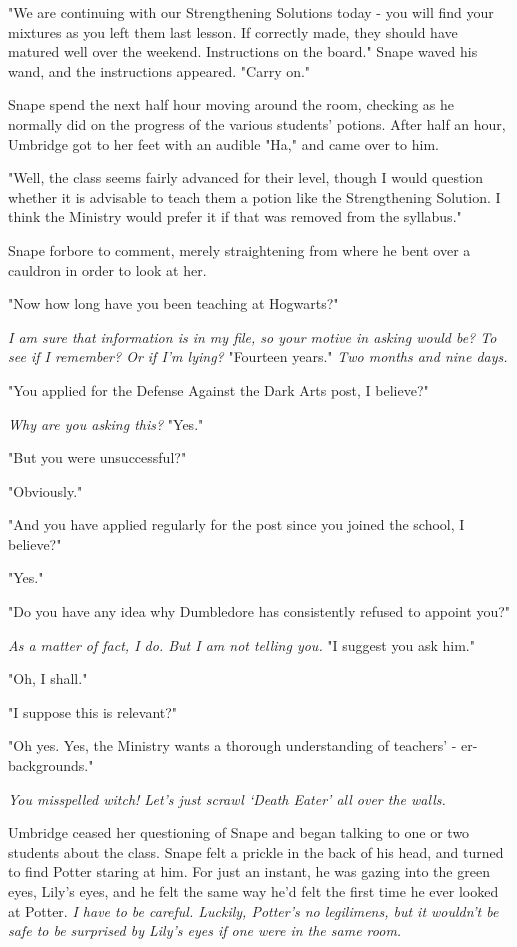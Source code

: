 "We are continuing with our Strengthening Solutions today - you will find your mixtures as you left them last lesson. If correctly made, they should have matured well over the weekend. Instructions on the board." Snape waved his wand, and the instructions appeared. "Carry on."

Snape spend the next half hour moving around the room, checking as he normally did on the progress of the various students' potions. After half an hour, Umbridge got to her feet with an audible "Ha," and came over to him.

"Well, the class seems fairly advanced for their level, though I would question whether it is advisable to teach them a potion like the Strengthening Solution. I think the Ministry would prefer it if that was removed from the syllabus."

Snape forbore to comment, merely straightening from where he bent over a cauldron in order to look at her.

"Now{\el} how long have you been teaching at Hogwarts?"

\emph{I am sure that information is in my file, so your motive in asking would be{\el}? To see if I remember? Or if I'm lying?} "Fourteen years." \emph{Two months and nine days.}

"You applied for the Defense Against the Dark Arts post, I believe?"

\emph{Why are you asking this?} "Yes."

"But you were unsuccessful?"

"Obviously."

"And you have applied regularly for the post since you joined the school, I believe?"

"Yes."

"Do you have any idea why Dumbledore has consistently refused to appoint you?"

\emph{As a matter of fact, I do. But I am not telling you.} "I suggest you ask him."

"Oh, I shall."

"I suppose this is relevant?"

"Oh yes. Yes, the Ministry wants a thorough understanding of teachers' - er- backgrounds."

\emph{You misspelled witch! Let's just scrawl `Death Eater' all over the walls.}

Umbridge ceased her questioning of Snape and began talking to one or two students about the class. Snape felt a prickle in the back of his head, and turned to find Potter staring at him. For just an instant, he was gazing into the green eyes, Lily's eyes, and he felt the same way he'd felt the first time he ever looked at Potter. \emph{I have to be careful. Luckily, Potter's no legilimens, but it wouldn't be safe to be surprised by Lily's eyes if one were in the same room.}

